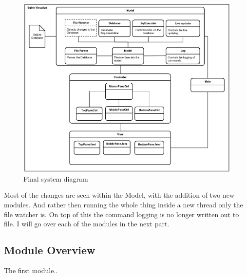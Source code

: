 \begin{figure}[H]
	\centering
	\includegraphics[scale=0.2]{images/system_diagram_new.png}
	\caption{Final system diagram}
	\label{fig:design_new}
\end{figure}

Most of the changes are seen within the Model, with the addition of two new modules. And rather then running the whole thing inside a new thread only the file watcher is. On top of this the command logging is no longer written out to file. I will go over each of the modules in the next part.

\subsection{Module Overview}
\label{subsec:module_overview}

The first module..